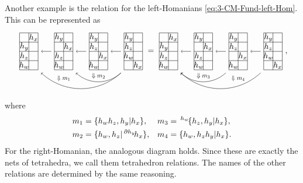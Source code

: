 \documentclass[11pt, reqno]{amsart} %
\newcommand{\act}[1]{\,\sp{#1}\!}
\newcommand{\strsquare}[4][]{
  \begin{scope}[every node/.append style={overlay},#1]
    \foreach \x [count=\i] in {#4}{
      \ifx\x\empty
      \else
        \pgfmathsetmacro{\modResult}{mod(\i-1, #2)}
        \pgfmathsetmacro{\quotResult}{(\i-\modResult-1)/#2}
        \node at (\modResult,-\quotResult) {\x};
      \fi
    }
    \foreach \x in {0,1,...,#2}{
      \draw ({-1/2+\x},{1/2})--({-1/2+\x},{-#3+1/2});
    }
    \foreach \y in {0,1,...,#3}{
      \draw ({-1/2},{1/2-\y})--({#2-1/2},{1/2-\y});
    }
  \end{scope}
}
\theoremstyle{definition}
\theoremstyle{remark}
\numberwithin{equation}{section}
\begin{document}
Another example is the relation for the left-Homanians \eqref{eq:3-CM-Fund-left-Hom}. This can be represented as
\[
  \begin{tikzpicture}[baseline=-2pt]
    \node (A) at (2.25,0) {\tikz[baseline=-2pt,scale=.4]{\strsquare{2}{4}{$h_y$,,$h_z$,,$h_w$,,,$h_x$}}};
    \node (B) at (.75,0) {\tikz[baseline=-2pt,scale=.4]{\strsquare{2}{4}{$h_y$,,$h_z$,,,$h_x$,$h_w$,}}};
    \node (C) at (-.75,0) {\tikz[baseline=-2pt,scale=.4]{\strsquare{2}{4}{$h_y$,,,$h_x$,$h_z$,,$h_w$,}}};
    \node (D) at (-2.25,0) {\tikz[baseline=-2pt,scale=.4]{\strsquare{2}{4}{,$h_x$,$h_y$,,$h_z$,,$h_w$,}}};
    \draw [->] (A) to (B);
    \draw [->] (B) to (C);
    \draw [->] (C) to (D);
    \draw [->,bend left=1.5cm] (A.south west) to (D.south east);
    \draw [->,bend left=1.5cm] (A.south west) to node (D) {} (C.south east);
    \path (B.north) to [pos=15/16] coordinate (A) (B.south);
    \path (B) to node [transform shape,scale=.75] {$\Downarrow m_2$} (D);
    \path (C.north) to [pos=5/4] coordinate (D) (C.south);
    \path (C) to node [transform shape,scale=.75] {$\Downarrow m_1$} (D);
  \end{tikzpicture}
  =
  \begin{tikzpicture}[baseline=-2pt]
    \node (A) at (2.25,0) {\tikz[baseline=-2pt,scale=.4]{\strsquare{2}{4}{$h_y$,,$h_z$,,$h_w$,,,$h_x$}}};
    \node (B) at (.75,0) {\tikz[baseline=-2pt,scale=.4]{\strsquare{2}{4}{$h_y$,,$h_z$,,,$h_x$,$h_w$,}}};
    \node (C) at (-.75,0) {\tikz[baseline=-2pt,scale=.4]{\strsquare{2}{4}{$h_y$,,,$h_x$,$h_z$,,$h_w$,}}};
    \node (D) at (-2.25,0) {\tikz[baseline=-2pt,scale=.4]{\strsquare{2}{4}{,$h_x$,$h_y$,,$h_z$,,$h_w$,}}};
    \draw [->] (A) to (B);
    \draw [->] (B) to (C);
    \draw [->] (C) to (D);
    \draw [->,bend left=1.5cm] (A.south west) to (D.south east);
    \draw [->,bend left=1.5cm] (B.south west) to node (A) {} (D.south east);
    \path (C) to node [transform shape,scale=.75] {$\Downarrow m_3$} (A);
    \path (B.north) to [pos=5/4] coordinate (D) (B.south);
    \path (B) to node [transform shape,scale=.75] {$\Downarrow m_4$} (D);
  \end{tikzpicture},
\]
where
\begin{align}
  \nonumber
  m_1 &= \{h_wh_z,h_y|h_x\}, &
  m_3 &= \act{h_w}\{h_z,h_y|h_x\}, \\
  \nonumber
  m_2 &= \{h_w,h_z|\act{\partial h_y}h_x\}, &
  m_4 &= \{h_w,h_zh_y|h_x\}.
\end{align}
For the right-Homanian, the analogous diagram holds. Since these are exactly the nets of tetrahedra, we call them tetrahedron relations. The names of the other relations are determined by the same reasoning.
\end{document}
